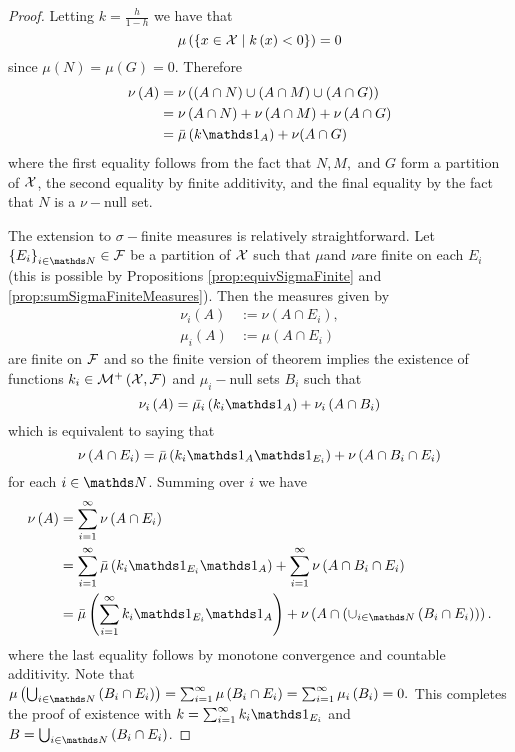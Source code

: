 \begin{proof}
Letting $k=\frac{h}{1-h}$ we have that 
\[
\mu\left(\left\{ x\in\mathcal{X}\mid k\left(x\right)<0\right\} \right)=0
\]
since $\mu\left(N\right)=\mu\left(G\right)=0.$ Therefore
\begin{align*}
\nu\left(A\right) & =\nu\left(\left(A\cap N\right)\cup\left(A\cap M\right)\cup\left(A\cap G\right)\right)\\
 & =\nu\left(A\cap N\right)+\nu\left(A\cap M\right)+\nu\left(A\cap G\right)\\
 & =\lebInt{\mu}{k\indicate_{A}}+\nu(A\cap G)
\end{align*}
where the first equality follows from the fact that $N,M,$ and $G$
form a partition of $\mathcal{X}$, the second equality by finite additivity,
and the final equality by the fact that $N$ is a $\nu-$null set.

The extension to $\sigma-$finite measures is relatively straightforward.
Let $\left\{ E_{i}\right\} _{i\in\N}\in\F$ be a partition of $\mathcal{X}$
such that $\mu$and $\nu$are finite on each $E_{i}$ (this is possible
by Propositions \ref{prop:equivSigmaFinite} and \ref{prop:sumSigmaFiniteMeasures}).
Then the measures given by
\begin{align*}
\nu_{i}\left(A\right) & :=\nu\left(A\cap E_{i}\right),\\
\mu_{i}\left(A\right) & :=\mu\left(A\cap E_{i}\right)
\end{align*}
are finite on $\mathcal{F}$ and so the finite version of theorem implies the
existence of functions $k_{i}\in\mathcal{M}^{+}\left(\mathcal{X},\mathcal{F}\right)$ and $\mu_{i}-$null
sets $B_{i}$ such that 
\[
\nu_{i}\left(A\right)=\lebInt{\mu_{i}}{k_{i}\indicate_{A}}+\nu_{i}\left(A\cap B_{i}\right)
\]
which is equivalent to saying that 
\[
\nu\left(A\cap E_{i}\right)=\lebInt{\mu}{k_{i}\indicate_{A}\indicate_{E_{i}}}+\nu\left(A\cap B_{i}\cap E_{i}\right)
\]
for each $i\in\N$. Summing over $i$ we have 
\begin{align*}
\nu\left(A\right) & =\sum_{i=1}^{\infty}\nu\left(A\cap E_{i}\right)\\
 & =\sum_{i=1}^{\infty}\lebInt{\mu}{k_{i}\indicate_{E_{i}}\indicate_{A}}+\sum_{i=1}^{\infty}\nu\left(A\cap B_{i}\cap E_{i}\right)\\
 & =\lebInt{\mu}{\sum_{i=1}^{\infty}k_{i}\indicate_{E_{i}}\indicate_{A}}+\nu\left(A\cap\left(\cup_{i\in\N}\left(B_{i}\cap E_{i}\right)\right)\right).
\end{align*}
where the last equality follows by monotone convergence and countable
additivity. Note that $\mu\left(\bigcup_{i\in\N}\left(B_{i}\cap E_{i}\right)\right)=\sum_{i=1}^{\infty}\mu\left(B_{i}\cap E_{i}\right)=\sum_{i=1}^{\infty}\mu_{i}\left(B_{i}\right)=0.$
This completes the proof of existence with $k=\sum_{i=1}^{\infty}k_{i}\indicate_{E_{i}}$
and $B=\bigcup_{i\in\N}\left(B_{i}\cap E_{i}\right)$.


\end{proof}
